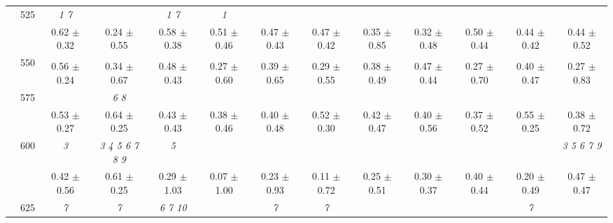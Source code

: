\begin{table}[h]
{\begin{tabular}{
        ccccccccccccc}
 & \multirow{2}{*}{525}& \cellcolor[HTML]{EFEFEF} \textit{ 1 7 }& \cellcolor[HTML]{EFEFEF} & \cellcolor[HTML]{EFEFEF} \textit{ 1 7 }& \cellcolor[HTML]{EFEFEF} \textit{ 1 }& \cellcolor[HTML]{EFEFEF} & \cellcolor[HTML]{EFEFEF} & \cellcolor[HTML]{EFEFEF} & \cellcolor[HTML]{EFEFEF} & \cellcolor[HTML]{EFEFEF} & \cellcolor[HTML]{EFEFEF} & \cellcolor[HTML]{EFEFEF}  \\ 
 & & \cellcolor[HTML]{EFEFEF} 0.62 $\pm$ 0.32& \cellcolor[HTML]{EFEFEF} 0.24 $\pm$ 0.55& \cellcolor[HTML]{EFEFEF} 0.58 $\pm$ 0.38& \cellcolor[HTML]{EFEFEF} 0.51 $\pm$ 0.46& \cellcolor[HTML]{EFEFEF} 0.47 $\pm$ 0.43& \cellcolor[HTML]{EFEFEF} 0.47 $\pm$ 0.42& \cellcolor[HTML]{EFEFEF} 0.35 $\pm$ 0.85& \cellcolor[HTML]{EFEFEF} 0.32 $\pm$ 0.48& \cellcolor[HTML]{EFEFEF} 0.50 $\pm$ 0.44& \cellcolor[HTML]{EFEFEF} 0.44 $\pm$ 0.42& \cellcolor[HTML]{EFEFEF} 0.44 $\pm$ 0.52 \\ 
 & \multirow{2}{*}{550}& & & & & & & & & & &  \\ 
 & & 0.56 $\pm$ 0.24& 0.34 $\pm$ 0.67& 0.48 $\pm$ 0.43& 0.27 $\pm$ 0.60& 0.39 $\pm$ 0.65& 0.29 $\pm$ 0.55& 0.38 $\pm$ 0.49& 0.47 $\pm$ 0.44& 0.27 $\pm$ 0.70& 0.40 $\pm$ 0.47& 0.27 $\pm$ 0.83 \\ 
 & \multirow{2}{*}{575}& \cellcolor[HTML]{EFEFEF} & \cellcolor[HTML]{EFEFEF} \textit{ 6 8 }& \cellcolor[HTML]{EFEFEF} & \cellcolor[HTML]{EFEFEF} & \cellcolor[HTML]{EFEFEF} & \cellcolor[HTML]{EFEFEF} & \cellcolor[HTML]{EFEFEF} & \cellcolor[HTML]{EFEFEF} & \cellcolor[HTML]{EFEFEF} & \cellcolor[HTML]{EFEFEF} & \cellcolor[HTML]{EFEFEF}  \\ 
 & & \cellcolor[HTML]{EFEFEF} 0.53 $\pm$ 0.27& \cellcolor[HTML]{EFEFEF} 0.64 $\pm$ 0.25& \cellcolor[HTML]{EFEFEF} 0.43 $\pm$ 0.43& \cellcolor[HTML]{EFEFEF} 0.38 $\pm$ 0.46& \cellcolor[HTML]{EFEFEF} 0.40 $\pm$ 0.48& \cellcolor[HTML]{EFEFEF} 0.52 $\pm$ 0.30& \cellcolor[HTML]{EFEFEF} 0.42 $\pm$ 0.47& \cellcolor[HTML]{EFEFEF} 0.40 $\pm$ 0.56& \cellcolor[HTML]{EFEFEF} 0.37 $\pm$ 0.52& \cellcolor[HTML]{EFEFEF} 0.55 $\pm$ 0.25& \cellcolor[HTML]{EFEFEF} 0.38 $\pm$ 0.72 \\ 
 & \multirow{2}{*}{600}& \textit{ 3 }& \textit{ 3 4 5 6 7 8 9 }& \textit{ 5 }& & & & & & & & \textit{ 3 5 6 7 9 } \\ 
 & & 0.42 $\pm$ 0.56& 0.61 $\pm$ 0.25& 0.29 $\pm$ 1.03& 0.07 $\pm$ 1.00& 0.23 $\pm$ 0.93& 0.11 $\pm$ 0.72& 0.25 $\pm$ 0.51& 0.30 $\pm$ 0.37& 0.40 $\pm$ 0.44& 0.20 $\pm$ 0.49& 0.47 $\pm$ 0.47 \\ 
 & \multirow{2}{*}{625}& \cellcolor[HTML]{EFEFEF} \textit{ 7 }& \cellcolor[HTML]{EFEFEF} \textit{ 7 }& \cellcolor[HTML]{EFEFEF} \textit{  6  7 10 }& \cellcolor[HTML]{EFEFEF} & \cellcolor[HTML]{EFEFEF} \textit{ 7 }& \cellcolor[HTML]{EFEFEF} \textit{ 7 }& \cellcolor[HTML]{EFEFEF} & \cellcolor[HTML]{EFEFEF} & \cellcolor[HTML]{EFEFEF} & \cellcolor[HTML]{EFEFEF} \textit{ 7 }& \cellcolor[HTML]{EFEFEF}  \\ 

\end{tabular}}
\end{table}
